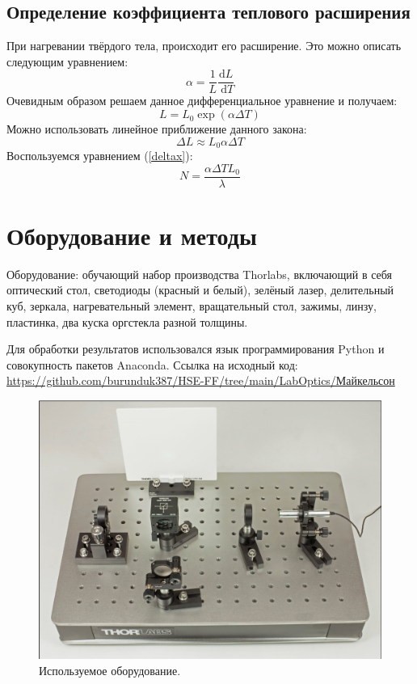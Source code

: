 \documentclass[a4paper, 12pt]{article}
\begin{document}
	\subsection*{Определение коэффициента теплового расширения}
	При нагревании твёрдого тела, происходит его расширение. Это можно описать следующим уравнением:
	\begin{equation}
		\alpha=\frac{1}{L} \frac{\mathrm{d} L}{\mathrm{~d} T}
	\end{equation}
	Очевидным образом решаем данное дифференциальное уравнение и получаем:
	\begin{equation}
		L = L_0 \exp(\alpha \Delta T)
	\end{equation}
	Можно использовать линейное приближение данного закона:
	\begin{equation}
		\Delta L \approx L_0 \alpha \Delta T
	\end{equation}
	Воспользуемся уравнением (\ref{deltax}):
	\begin{equation}\label{hot}
		N = \frac{\alpha \Delta T L_0}{\lambda}
	\end{equation}
	\section*{Оборудование и методы}
	Оборудование: обучающий набор производства Thorlabs, включающий в себя оптический стол, светодиоды (красный и белый), зелёный лазер, делительный куб, зеркала, нагревательный элемент, вращательный стол, зажимы, линзу, пластинка, два куска оргстекла разной толщины.
	
	Для обработки результатов использовался язык программирования Python и совокупность пакетов Anaconda.
	Ссылка на исходный код:
	\newline \href{https://github.com/burunduk387/HSE-FF/tree/main/LabOptics/Фотонные\%20кристаллы}{https://github.com/burunduk387/HSE-FF/tree/main/LabOptics/Майкельсон}
	\begin{figure}[H]
	\centering
	\includegraphics[width=0.75\linewidth]{Equip.png}
	\caption{Используемое оборудование.}
	\label{fig:2}
	\end{figure}
\end{document}
